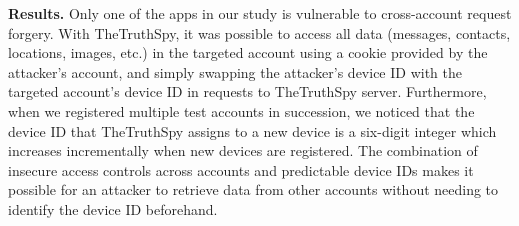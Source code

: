 
\textbf{Results.}  Only one of the apps in our study is vulnerable to
cross-account request forgery.
With TheTruthSpy, it was possible to
access all data (messages, contacts, locations, images, etc.)  in the
targeted account using a cookie provided by the attacker's account,
and simply swapping the attacker's device ID with the targeted
account's device ID in requests to TheTruthSpy server.  Furthermore,
when we registered multiple test accounts in succession, we noticed
that the device ID that TheTruthSpy assigns to a new device is a six-digit
integer which increases incrementally when new devices are registered.
The combination of insecure access controls across accounts and
predictable device IDs makes it possible for an attacker to retrieve
data from other accounts without needing to identify the device ID
beforehand.


